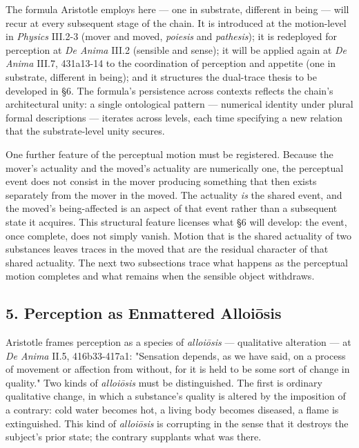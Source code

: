 \documentclass[12pt]{article}
\begin{document}
The formula Aristotle employs here --- one in substrate, different in being --- will recur at every subsequent stage of the chain. It is introduced at the motion-level in \textit{Physics} III.2-3 (mover and moved, \textit{poiesis} and \textit{pathesis}); it is redeployed for perception at \textit{De Anima} III.2 (sensible and sense); it will be applied again at \textit{De Anima} III.7, 431a13-14 to the coordination of perception and appetite (one in substrate, different in being); and it structures the dual-trace thesis to be developed in §6. The formula's persistence across contexts reflects the chain's architectural unity: a single ontological pattern --- numerical identity under plural formal descriptions --- iterates across levels, each time specifying a new relation that the substrate-level unity secures.

One further feature of the perceptual motion must be registered. Because the mover's actuality and the moved's actuality are numerically one, the perceptual event does not consist in the mover producing something that then exists separately from the mover in the moved. The actuality \textit{is} the shared event, and the moved's being-affected is an aspect of that event rather than a subsequent state it acquires. This structural feature licenses what §6 will develop: the event, once complete, does not simply vanish. Motion that is the shared actuality of two substances leaves traces in the moved that are the residual character of that shared actuality. The next two subsections trace what happens as the perceptual motion completes and what remains when the sensible object withdraws.

\subsection*{5. Perception as Enmattered Alloiōsis}

Aristotle frames perception as a species of \textit{alloiōsis} --- qualitative alteration --- at \textit{De Anima} II.5, 416b33-417a1: "Sensation depends, as we have said, on a process of movement or affection from without, for it is held to be some sort of change in quality." Two kinds of \textit{alloiōsis} must be distinguished. The first is ordinary qualitative change, in which a substance's quality is altered by the imposition of a contrary: cold water becomes hot, a living body becomes diseased, a flame is extinguished. This kind of \textit{alloiōsis} is corrupting in the sense that it destroys the subject's prior state; the contrary supplants what was there.
\end{document}
